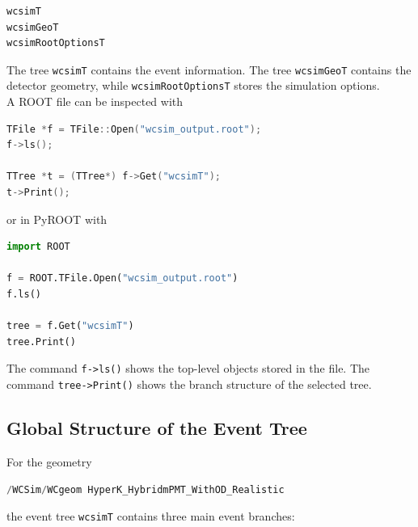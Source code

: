 \documentclass{article}
\numberwithin{table}{subsection}
\numberwithin{figure}{subsection}
\numberwithin{equation}{subsection}
\numberwithin{footnote}{subsection}
\begin{document}
\begin{lstlisting}[language=C++]
wcsimT
wcsimGeoT
wcsimRootOptionsT
\end{lstlisting}
The tree \texttt{wcsimT} contains the event information. The tree
\texttt{wcsimGeoT} contains the detector geometry, while
\texttt{wcsimRootOptionsT} stores the simulation options.\\
A ROOT file can be inspected with

\begin{lstlisting}[language=C++]
TFile *f = TFile::Open("wcsim_output.root");
f->ls();

TTree *t = (TTree*) f->Get("wcsimT");
t->Print();
\end{lstlisting}
or in PyROOT with
\begin{lstlisting}[language=python]
import ROOT

f = ROOT.TFile.Open("wcsim_output.root")
f.ls()

tree = f.Get("wcsimT")
tree.Print()
\end{lstlisting}
The command \texttt{f->ls()} shows the top-level objects stored in the file.
The command \texttt{tree->Print()} shows the branch structure of the selected
tree.

\subsection{Global Structure of the Event Tree}

For the geometry

\begin{lstlisting}[language=C++]
/WCSim/WCgeom HyperK_HybridmPMT_WithOD_Realistic
\end{lstlisting}
the event tree \texttt{wcsimT} contains three main event branches:
\end{document}
